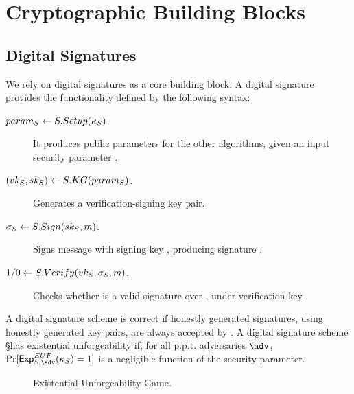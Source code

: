 \section{Cryptographic Building Blocks}
\label{app:crypto-building-blocks}

\subsection{Digital Signatures}
\label{sapp:digital-signatures}

We rely on digital signatures as a core building block. A digital signature
provides the functionality defined by the following syntax:

\begin{description}
\item[$param_{S} \gets S.Setup(\kappa_{S})$.] It produces public parameters for the
  other algorithms, given an input security parameter \Ssecpar.
\item[$(vk_{S},sk_{S}) \gets S.KG(param_{S})$.] Generates a verification-signing
  key pair.
\item[$\sigma_{S} \gets S.Sign(sk_{S},m)$.] Signs message \msg with signing key
  \Ssk, producing signature \Ssig,  
\item[$1/0 \gets S.Verify(vk_{S},\sigma_{S},m)$.] Checks whether \Ssig is a valid
  signature over \msg, under verification key \Svk.
\end{description}

A digital signature scheme is correct if honestly generated signatures, using
honestly generated key pairs, are always accepted by \SVerify. 
%
A digital signature scheme \S has existential unforgeability if, for all p.p.t.
adversaries $\adv$, $\Pr[\ExpEUF(\Ssecpar) = 1]$ is a negligible function of the
security parameter.

\begin{figure}[ht!]
  \begin{minipage}[t]{\textwidth}
    \centering
  \end{minipage}
  \label{fig:euf-game}
  \caption{Existential Unforgeability Game.}
\end{figure}

